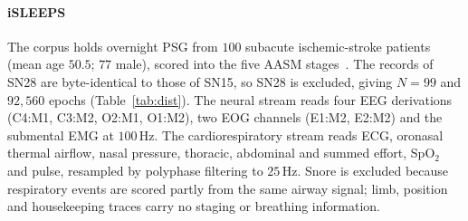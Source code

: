 \documentclass{ieeeaccess}
\begin{document}
\begin{table}[t]
\caption{The five cohorts. iSLEEPS is the development cohort; the others test generalization in
two settings: trained and tested on the cohort with patient-independent folds (CV), and trained on
iSLEEPS and applied unchanged (transfer).}
\label{tab:cohorts}
\centering
\small
{}
\end{table}

\paragraph{iSLEEPS} The corpus holds overnight PSG from $100$ subacute ischemic-stroke patients
(mean age $50.5$; $77$ male), scored into the five AASM stages~\cite{maiti2026isleeps}. The
records of SN28 are byte-identical to those of SN15, so SN28 is excluded, giving $N=99$ and
$92{,}560$ epochs (Table~\ref{tab:dist}). The neural stream reads four EEG derivations (C4:M1,
C3:M2, O2:M1, O1:M2), two EOG channels (E1:M2, E2:M2) and the submental EMG at $100$\,Hz. The
cardiorespiratory stream reads ECG, oronasal thermal airflow, nasal pressure, thoracic,
abdominal and summed effort, SpO$_2$ and pulse, resampled by polyphase filtering to
$25$\,Hz. Snore is excluded because respiratory events are scored partly from the same airway
signal; limb, position and housekeeping traces carry no staging or breathing information.
\end{document}
